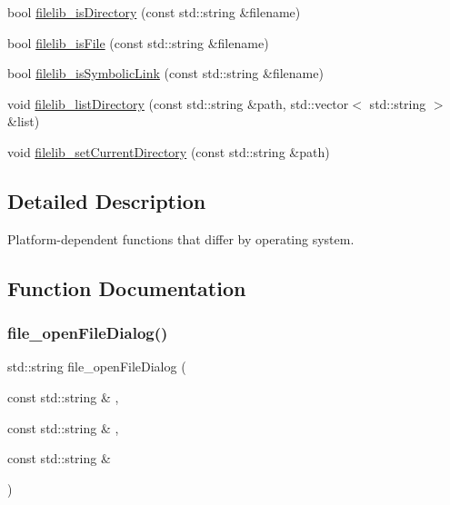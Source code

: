 \begin{DoxyCompactItemize}
bool \mbox{\hyperlink{namespaceplatform_a68319ac7586223f385d7785f1b38e1b9}{filelib\+\_\+is\+Directory}} (const std\+::string \&filename)
\item 
bool \mbox{\hyperlink{namespaceplatform_aca0d9e2b4896bfd0f7a5cd64049188fc}{filelib\+\_\+is\+File}} (const std\+::string \&filename)
\item 
bool \mbox{\hyperlink{namespaceplatform_a69dc63b6fb991650c05dde15b04ca465}{filelib\+\_\+is\+Symbolic\+Link}} (const std\+::string \&filename)
\item 
void \mbox{\hyperlink{namespaceplatform_acad9142fb05b5756d75b8f8a68b5558b}{filelib\+\_\+list\+Directory}} (const std\+::string \&path, std\+::vector$<$ std\+::string $>$ \&list)
\item 
void \mbox{\hyperlink{namespaceplatform_afe79a966d14e3b8d08939712884fa9d3}{filelib\+\_\+set\+Current\+Directory}} (const std\+::string \&path)
\end{DoxyCompactItemize}


\subsection{Detailed Description}
Platform-\/dependent functions that differ by operating system. 

\subsection{Function Documentation}
\mbox{\label{namespaceplatform_a1b26348d2c3514ce39ed9d5017e4c872}} 
\subsubsection{\texorpdfstring{file\+\_\+open\+File\+Dialog()}{file\_openFileDialog()}}
{\footnotesize\ttfamily std\+::string file\+\_\+open\+File\+Dialog (\begin{DoxyParamCaption}\item[{const std\+::string \&}]{,  }\item[{const std\+::string \&}]{,  }\item[{const std\+::string \&}]{ }\end{DoxyParamCaption})}

\mbox{\label{namespaceplatform_aa30655cd42c277a7c5ed7aba21cf0050}} 
